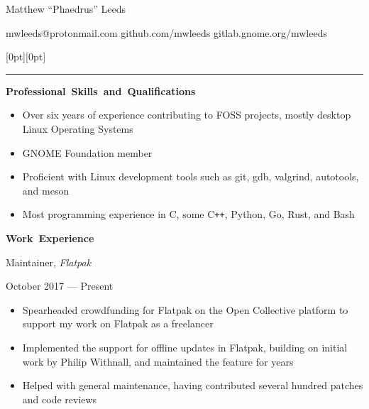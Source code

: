 \documentclass[11pt]{article}
\begin{document}
\centerline{\huge Matthew “Phaedrus” Leeds}
\vspace{0.4em}
\centerline{\normalsize mwleeds@protonmail.com \space \textbar \space github.com/mwleeds \space \textbar \space gitlab.gnome.org/mwleeds}

\noindent \begin{minipage}[t]{\textwidth}
\raisebox{9pt}[0pt][0pt]{\rule{\textwidth}{0.2mm}\hspace{-\textwidth}}
\end{minipage}

\vspace{0.8em}
\hbox{\large \textbf{Professional Skills and Qualifications}}

\begin{itemize}
  \item Over six years of experience contributing to FOSS projects, mostly desktop Linux Operating Systems
  \item GNOME Foundation member
  \item Proficient with Linux development tools such as git, gdb, valgrind, autotools, and meson
  \item Most programming experience in C, some C\texttt{++}, Python, Go, Rust, and Bash
\end{itemize}

\vspace{0.8em}
\hbox{\large \textbf{Work Experience}}

\begin{minipage}[t]{0.65\textwidth}
\flushleft
Maintainer, \textit{Flatpak}\\
\end{minipage}
\begin{minipage}[t]{0.30\textwidth}
\flushright
October 2017 --- Present\\
\end{minipage}

\begin{itemize}
  \item Spearheaded crowdfunding for Flatpak on the Open Collective platform to support my work on Flatpak as a freelancer
  \item Implemented the support for offline updates in Flatpak, building on initial work by Philip Withnall, and maintained the feature for years
  \item Helped with general maintenance, having contributed several hundred patches and code reviews
\end{itemize}
\end{document}
